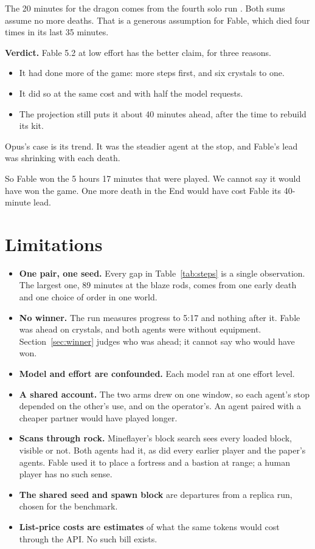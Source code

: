 \documentclass[11pt,a4paper]{article}
\begin{document}
The 20 minutes for the dragon comes from the fourth solo run \citep{batsuk2026fourth}. Both sums assume no more deaths. That is a generous assumption for Fable, which died four times in its last 35 minutes.

\textbf{Verdict.} Fable 5.2 at low effort has the better claim, for three reasons.

\begin{itemize}
\item It had done more of the game: more steps first, and six crystals to one.
\item It did so at the same cost and with half the model requests.
\item The projection still puts it about 40 minutes ahead, after the time to rebuild its kit.
\end{itemize}

Opus's case is its trend. It was the steadier agent at the stop, and Fable's lead was shrinking with each death.

So Fable won the 5 hours 17 minutes that were played. We cannot say it would have won the game. One more death in the End would have cost Fable its 40-minute lead.

\section{Limitations}
\label{sec:limits}

\begin{itemize}
\item \textbf{One pair, one seed.} Every gap in Table~\ref{tab:steps} is a single observation. The largest one, 89 minutes at the blaze rods, comes from one early death and one choice of order in one world.
\item \textbf{No winner.} The run measures progress to 5:17 and nothing after it. Fable was ahead on crystals, and both agents were without equipment. Section~\ref{sec:winner} judges who was ahead; it cannot say who would have won.
\item \textbf{Model and effort are confounded.} Each model ran at one effort level.
\item \textbf{A shared account.} The two arms drew on one window, so each agent's stop depended on the other's use, and on the operator's. An agent paired with a cheaper partner would have played longer.
\item \textbf{Scans through rock.} Mineflayer's block search sees every loaded block, visible or not. Both agents had it, as did every earlier player and the paper's agents. Fable used it to place a fortress and a bastion at range; a human player has no such sense.
\item \textbf{The shared seed and spawn block} are departures from a replica run, chosen for the benchmark.
\item \textbf{List-price costs are estimates} of what the same tokens would cost through the API. No such bill exists.
\end{itemize}
\end{document}
